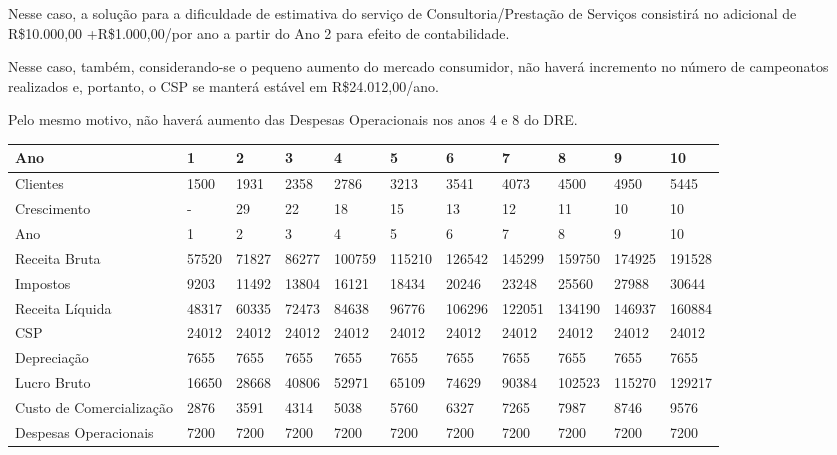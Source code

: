 \documentclass[a4paper, 12pt]{paper}
\begin{document}
\newpage
Nesse caso, a solução para a dificuldade de estimativa do serviço de Consultoria/Prestação de Serviços consistirá no adicional de R\$10.000,00 +R\$1.000,00/por ano a partir do Ano 2 para efeito de contabilidade.

Nesse caso, também, considerando-se o pequeno aumento do mercado consumidor, não haverá incremento no número de campeonatos realizados e, portanto, o CSP se manterá estável em R\$24.012,00/ano.

Pelo mesmo motivo, não haverá aumento das Despesas Operacionais nos anos 4 e 8 do DRE.

\begin{landscape}
	\begin{table}[ht]
		\centering
		\begin{tabular}{p{5cm}p{1.5cm}p{1.5cm}p{1.5cm}p{1.5cm}p{1.5cm}p{1.5cm}p{1.5cm}p{1.5cm}p{1.5cm}p{1.5cm}}
			\hline
			\cellcolor{gray}Ano & \cellcolor{gray}1 & \cellcolor{gray}2 & \cellcolor{gray}3 & \cellcolor{gray}4 & \cellcolor{gray}5 & \cellcolor{gray}6 & \cellcolor{gray}7 & \cellcolor{gray}8 &\cellcolor{gray} 9 & \cellcolor{gray}10 \\ \hline
	Clientes & 1500 & 1931 & 2358 & 2786 & 3213 & 3541 & 4073 & 4500 & 4950 & 5445 \\ \hline
	Crescimento & - & 29 & 22 & 18 & 15 & 13 & 12 & 11 & 10 & 10 \\ \hline
	Ano  & 1 & 2 & 3 & 4 & 5 & 6 & 7 & 8 & 9 & 10 \\ \hline
	Receita Bruta & 57520 & 71827 & 86277 & 100759 & 115210 & 126542 & 145299 & 159750 & 174925 & 191528 \\ \hline
	Impostos & 9203 & 11492 & 13804 & 16121 & 18434 & 20246 & 23248 & 25560 & 27988 & 30644 \\ \hline
	Receita Líquida & 48317 & 60335 & 72473 & 84638 & 96776 & 106296 & 122051 & 134190 & 146937 & 160884 \\ \hline
	CSP & 24012 & 24012 & 24012 & 24012 & 24012 & 24012 & 24012 & 24012 & 24012 & 24012 \\ \hline
	Depreciação & 7655 & 7655 & 7655 & 7655 & 7655 & 7655 & 7655 & 7655 & 7655 & 7655 \\ \hline
	Lucro Bruto & 16650 & 28668 & 40806 & 52971 & 65109 & 74629 & 90384 & 102523 & 115270 & 129217 \\ \hline
	Custo de Comercialização & 2876 & 3591 & 4314 & 5038 & 5760 & 6327 & 7265 & 7987 & 8746 & 9576 \\ \hline
	Despesas Operacionais & 7200 & 7200 & 7200 & 7200 & 7200 & 7200 & 7200 & 7200 & 7200 & 7200 \\ \hline

\end{tabular}
\end{table}
\end{landscape}
\end{document}
